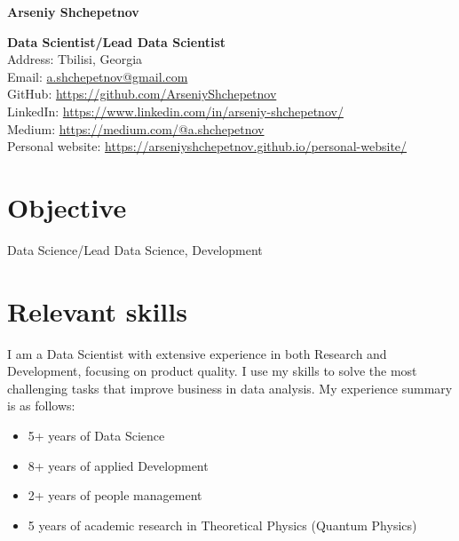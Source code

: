 \documentclass[10pt,a4paper]{article}
\newcommand{\vacancyName}{PhD student}
\begin{document}
	

	\raggedright{\Large{\textbf{Arseniy Shchepetnov}}}\\[0.3cm]
	
	\begin{minipage}[t]{0.7\textwidth}
		\vspace{0pt}
		\raggedright{\textbf{Data Scientist/Lead Data Scientist}}\\[0.3cm]
		\noindent Address: Tbilisi, Georgia \\[0.1cm]
		\noindent Email: \href{mailto:a.shchepetnov@gmail.com}{a.shchepetnov@gmail.com}\\[0.1cm]
		\noindent GitHub: \href{https://github.com/ArseniyShchepetnov}{https://github.com/ArseniyShchepetnov}\\
            \noindent LinkedIn: \href{https://www.linkedin.com/in/arseniy-shchepetnov/}{https://www.linkedin.com/in/arseniy-shchepetnov/}\\
            \noindent Medium: \href{https://medium.com/@a.shchepetnov}{https://medium.com/@a.shchepetnov} \\
            \noindent Personal website: \href{https://arseniyshchepetnov.github.io/personal-website/}{https://arseniyshchepetnov.github.io/personal-website/}
	\end{minipage}
	\begin{minipage}[t]{0.2\textwidth}
		\vspace{0pt}
	\end{minipage}
	
	
	\section*{Objective}
	
	Data Science/Lead Data Science, Development
	
	\section*{Relevant skills}
	
	\setlength{\parindent}{3em}

	
I am a Data Scientist with extensive experience in both Research and Development, focusing on product quality.
I use my skills to solve the most challenging tasks that improve business in data analysis.
My experience summary is as follows:
\begin{itemize}
    \item 5+ years of Data Science
    \item 8+ years of applied Development
    \item 2+ years of people management
    \item 5 years of academic research in Theoretical Physics (Quantum Physics) 
\end{itemize}
\end{document}
